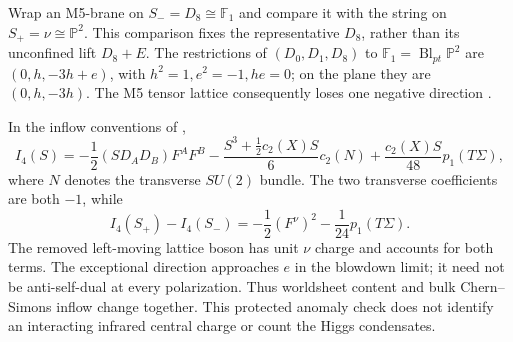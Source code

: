 Wrap an M5-brane on $S_-=D_8\cong\mathbb F_1$ and compare it with
the string on $S_+=\nu\cong\mathbb P^2$. This comparison fixes the
representative $D_8$, rather than its unconfined lift $D_8+E$.
The restrictions of $(D_0,D_1,D_8)$ to
$\mathbb F_1=\operatorname{Bl}_{pt}\mathbb P^2$ are $(0,h,-3h+e)$,
with $h^2=1,e^2=-1,h e=0$; on the plane they are $(0,h,-3h)$.
The M5 tensor lattice consequently loses one negative direction
\cite{Maldacena:1997de}.

In the inflow conventions of \cite[eq.~(2.21)]{Katz:2020ewz},
\begin{equation}
 I_4(S)=-\frac12(SD_AD_B)F^AF^B
 -\frac{S^3+\tfrac12c_2(X)S}{6}c_2(N)
 +\frac{c_2(X)S}{48}p_1(T\Sigma),
 \label{eq:x9-string-anomaly-general}
\end{equation}
where $N$ denotes the transverse $SU(2)$ bundle. The two transverse
coefficients are both $-1$, while
\begin{equation}
 I_4(S_+)-I_4(S_-)
 =-\frac12(F^\nu)^2-\frac1{24}p_1(T\Sigma).
 \label{eq:x9-string-anomaly-jump}
\end{equation}
The removed left-moving lattice boson has unit $\nu$ charge and
accounts for both terms. The exceptional direction approaches $e$
in the blowdown limit; it need not be anti-self-dual at every
polarization. Thus worldsheet content and bulk Chern--Simons inflow
change together. This protected anomaly check does not identify an
interacting infrared central charge or count the Higgs condensates.
